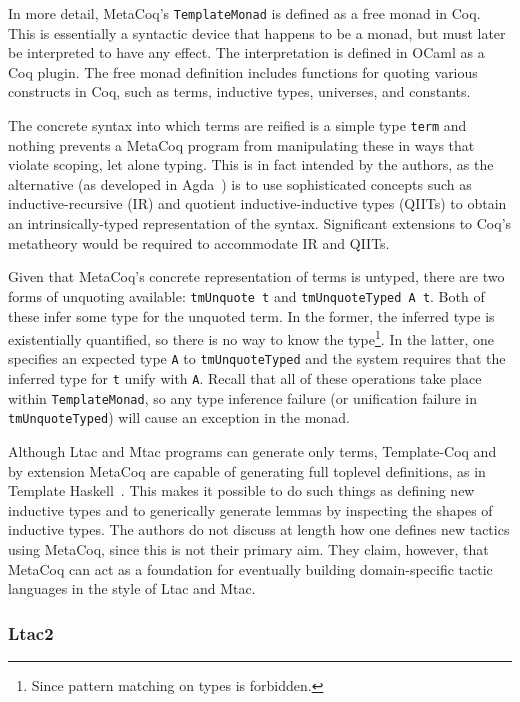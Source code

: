 \newcommand{\tmonad}{\texttt{TemplateMonad}}
In more detail, MetaCoq's \tmonad{} is defined as a free monad in Coq.
This is essentially a syntactic device that happens to be a monad, but must
later be interpreted to have any effect.
The interpretation is defined in OCaml as a Coq plugin.
The free monad definition includes functions for quoting various constructs in
Coq, such as terms, inductive types, universes, and constants.

The concrete syntax into which terms are reified is a simple type \texttt{term}
and nothing prevents a MetaCoq program from manipulating these in ways that
violate scoping, let alone typing.
This is in fact intended by the authors, as the alternative (as developed in
Agda~\cite{agda-reflection}) is to use sophisticated
concepts such as inductive-recursive (IR) and quotient inductive-inductive types
(QIITs) to obtain an intrinsically-typed representation of the syntax.
Significant extensions to Coq's metatheory would be required to accommodate IR
and QIITs.

Given that MetaCoq's concrete representation of terms is untyped, there are two
forms of unquoting available: \texttt{tmUnquote t} and \texttt{tmUnquoteTyped A t}.
Both of these infer some type for the unquoted term. In the former, the inferred
type is existentially quantified, so there is no way to know the
type\footnote{Since pattern matching on types is forbidden.}.
In the latter, one specifies an expected type \texttt{A} to
\texttt{tmUnquoteTyped} and the system requires that the inferred type for
\texttt{t} unify with \texttt{A}.
Recall that all of these operations take place within \tmonad, so any type
inference failure (or unification failure in \texttt{tmUnquoteTyped}) will cause
an exception in the monad.

Although Ltac and Mtac programs can generate only terms, Template-Coq and by
extension MetaCoq are capable of generating full toplevel definitions, as in
Template Haskell~\cite{template-haskell}.
This makes it possible to do such things as defining new inductive types and
to generically generate lemmas by inspecting the shapes of inductive types.
The authors do not discuss at length how one defines new tactics using MetaCoq,
since this is not their primary aim. They claim, however, that MetaCoq can act
as a foundation for eventually building domain-specific tactic languages in the
style of Ltac and Mtac.

\subsubsection{Ltac2}

